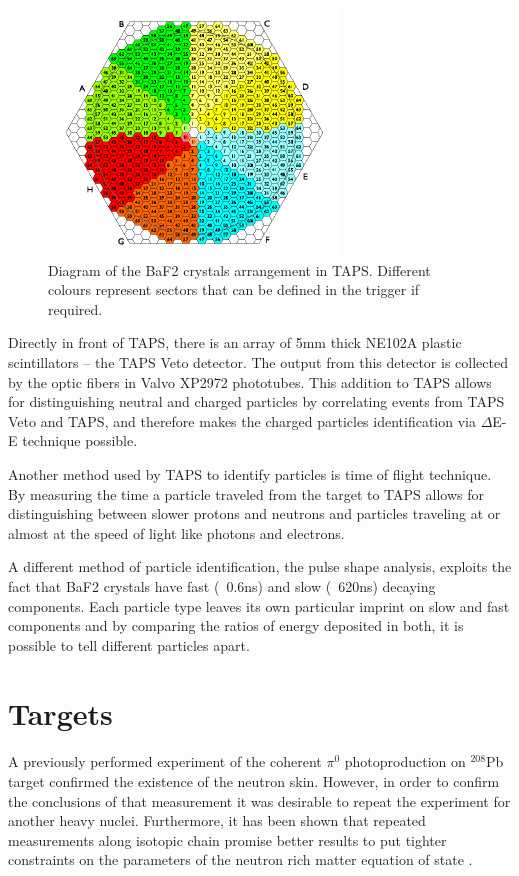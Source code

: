 \begin{figure}[H]
\begin{center}
\includegraphics[scale=1.4]{taps.png}
\caption{Diagram of the BaF2 crystals arrangement in TAPS. Different colours represent sectors that can be defined in the trigger if required.}
\label{taps}
\end{center}
\end{figure} 

\indent Directly  in  front  of  TAPS,  there  is  an  array  of  5mm  thick  NE102A  plastic scintillators – the TAPS Veto detector. The output from this detector is collected by the optic fibers in Valvo XP2972 phototubes. This addition to TAPS allows for distinguishing neutral and charged particles by correlating events from TAPS Veto and TAPS, and therefore makes the charged particles identification via $\Delta$E-E technique possible.

\indent Another method used by TAPS to identify particles is time of flight technique. By measuring  the  time  a  particle  traveled  from  the  target  to  TAPS  allows  for distinguishing between slower protons and neutrons and particles traveling at or almost at the speed of light like photons and electrons.

\indent A different method of particle identification, the pulse shape analysis, exploits the fact  that  BaF2  crystals  have  fast  (~0.6ns)  and  slow  (~620ns)  decaying components. Each particle type leaves its own particular imprint on slow and fast components and by comparing the ratios of energy deposited in both, it is possible to tell different particles apart.

\section{Targets}

\indent A previously performed experiment of the coherent $\pi^{0}$ photoproduction on $^{208}$Pb target confirmed the existence of the neutron skin. However, in order to confirm the conclusions of that measurement it was desirable to repeat the experiment for  another  heavy  nuclei.  Furthermore,  it  has  been shown  that  repeated measurements  along  isotopic  chain  promise  better  results  to  put  tighter constraints on the parameters of the neutron rich matter equation of state \cite{centelles}.

